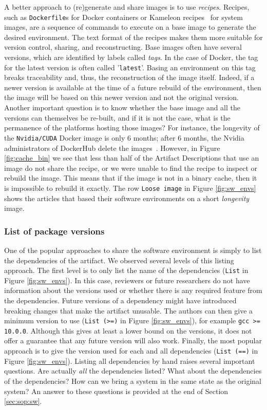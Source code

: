 \documentclass[sigconf,natbib=false]{acmart}
\newcommand{\ad}{Artifact Description}
\newcommand{\fmc}[1]{{\color{magenta} #1}} %
\begin{document}
A better approach to (re)generate and share images is to use \emph{recipes}.
Recipes, such as \texttt{Dockerfile}s for Docker containers or Kameleon recipes~\cite{ruiz_reconstructable_2015} for system images, are a sequence of commands to execute on a base image to generate the desired environment.
The text format of the recipes makes them more suitable for version control, sharing, and reconstructing.
Base images often have several versions, which are identified by labels called \emph{tags}.
In the case of Docker, the tag for the latest version is often called '\texttt{latest}'.
Basing an environment on this tag breaks traceability and, thus, the reconstruction of the image itself.
Indeed, if a newer version is available at the time of a future rebuild of the environment, then the image will be based on this newer version and not the original version.
Another important question is to know whether the base image and all the versions can themselves be re-built, and if it is not the case, what is the permanence of the platforms hosting those images?
For instance, the longevity of the \texttt{Nvidia/CUDA} Docker image is only 6 months; after 6 months, the Nvidia administrators of DockerHub delete the images\ \cite{nvidia_cuda_lifetime}.
However, in Figure \ref{fig:cache_bin} we see that less than half of the \ad s that use an image do not share the recipe, or we were unable to find the recipe to inspect or rebuild the image.
This means that if the image is not in a binary cache, then it is impossible to rebuild it exactly.
The row \texttt{Loose image} in Figure \ref{fig:sw_envs} shows the articles that based their software environments on a short \emph{longevity} image.


\subsubsection{List of package versions}\label{sec:sop:sw:list}

One of the popular approaches to share the software environment is simply to list the dependencies of the artifact.
We observed several levels of this listing approach.
The first level is to only list the name of the dependencies (\texttt{List} in Figure \ref{fig:sw_envs}).
In this case, reviewers or future researchers do not have information about the versions used or whether there is any required feature from the dependencies.
Future versions of a dependency might have introduced breaking changes that make the artifact unusable.
The authors can then give a minimum version to use (\texttt{List (>=)} in Figure \ref{fig:sw_envs}), for example \texttt{gcc >= 10.0.0}.
Although this gives at least a lower bound on the versions, it does not offer a guarantee that any future version will also work.
Finally, the most popular approach is to give the version used for each and all dependencies (\texttt{List (==)} in Figure \ref{fig:sw_envs}).
Listing all dependencies by hand raises several important questions.
Are actually \emph{all} the dependencies listed?
What about the dependencies of the dependencies?
How can we bring a system in the same state as the original system?
\fmc{An answer to these questions is provided at the end of Section \ref{sec:sop:sw}.}
\end{document}
